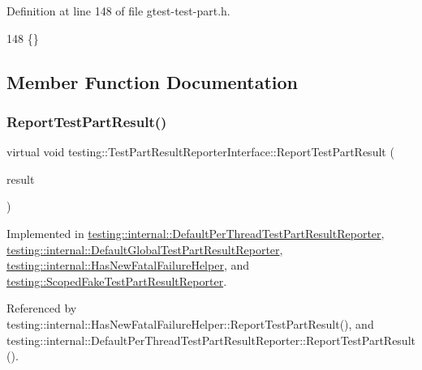 Definition at line 148 of file gtest-\/test-\/part.\+h.


\begin{DoxyCode}
148 \{\}
\end{DoxyCode}


\subsection{Member Function Documentation}
\mbox{\label{classtesting_1_1TestPartResultReporterInterface_aa2f920e7a5a0a6d0faf19e3727928c22}} 
\subsubsection{\texorpdfstring{Report\+Test\+Part\+Result()}{ReportTestPartResult()}}
{\footnotesize\ttfamily virtual void testing\+::\+Test\+Part\+Result\+Reporter\+Interface\+::\+Report\+Test\+Part\+Result (\begin{DoxyParamCaption}\item[{const \hyperlink{classtesting_1_1TestPartResult}{Test\+Part\+Result} \&}]{result }\end{DoxyParamCaption})\hspace{0.3cm}{\ttfamily [pure virtual]}}



Implemented in \hyperlink{classtesting_1_1internal_1_1DefaultPerThreadTestPartResultReporter_ac6dc08eadc4e5a2a64a91d0b6c6b3aad}{testing\+::internal\+::\+Default\+Per\+Thread\+Test\+Part\+Result\+Reporter}, \hyperlink{classtesting_1_1internal_1_1DefaultGlobalTestPartResultReporter_a6081576a23b964cfecab1e424d8044fc}{testing\+::internal\+::\+Default\+Global\+Test\+Part\+Result\+Reporter}, \hyperlink{classtesting_1_1internal_1_1HasNewFatalFailureHelper_a2d2e1faa1f3669b82810df97ac678a27}{testing\+::internal\+::\+Has\+New\+Fatal\+Failure\+Helper}, and \hyperlink{classtesting_1_1ScopedFakeTestPartResultReporter_a82531434f51632d98ed7cdcdb10b8b92}{testing\+::\+Scoped\+Fake\+Test\+Part\+Result\+Reporter}.



Referenced by testing\+::internal\+::\+Has\+New\+Fatal\+Failure\+Helper\+::\+Report\+Test\+Part\+Result(), and testing\+::internal\+::\+Default\+Per\+Thread\+Test\+Part\+Result\+Reporter\+::\+Report\+Test\+Part\+Result().

